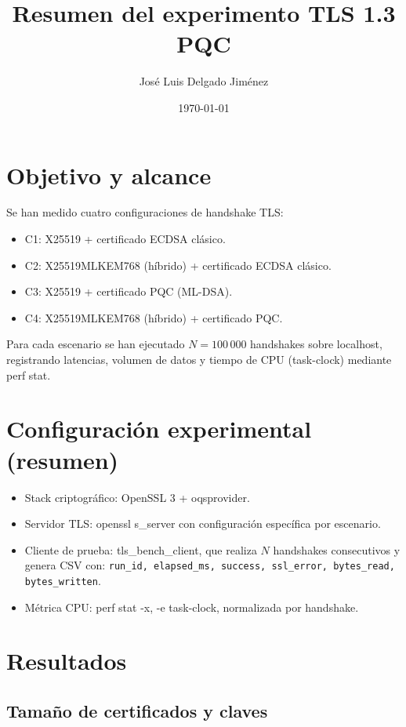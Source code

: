 \documentclass[11pt,a4paper]{article}
\title{Resumen del experimento TLS 1.3 PQC}
\author{José Luis Delgado Jiménez}
\date{\today}
\begin{document}
	\maketitle
	
	\section{Objetivo y alcance}
	
	Se han medido cuatro configuraciones de handshake TLS:
	
	\begin{itemize}
		\item C1: X25519 + certificado ECDSA clásico.
		\item C2: X25519MLKEM768 (híbrido) + certificado ECDSA clásico.
		\item C3: X25519 + certificado PQC (ML-DSA).
		\item C4: X25519MLKEM768 (híbrido) + certificado PQC.
	\end{itemize}
	
	Para cada escenario se han ejecutado \(N=100\,000\) handshakes sobre localhost, registrando latencias, volumen de datos y tiempo de CPU (task-clock) mediante perf stat.

	\section{Configuración experimental (resumen)}
	
	\begin{itemize}
		\item Stack criptográfico: OpenSSL 3 + oqsprovider.
		\item Servidor TLS: openssl s\_server con configuración específica por escenario.
		\item Cliente de prueba: tls\_bench\_client, que realiza \(N\) handshakes consecutivos y genera CSV con:
		\texttt{run\_id, elapsed\_ms, success, ssl\_error, bytes\_read, bytes\_written}.
		\item Métrica CPU: perf stat -x, -e task-clock, normalizada por handshake.
	\end{itemize}
	
	\section{Resultados}
	
	\subsection{Tamaño de certificados y claves}
	
\end{document}
